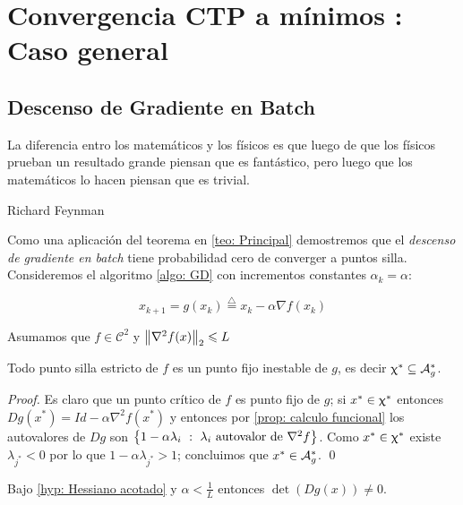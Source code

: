 \chapter{Convergencia CTP a m\'inimos : Caso general}\label{ch: aplicaciones}
\section{Descenso de Gradiente en Batch}

\epigraph{La diferencia entro los matem\'aticos y los f\'isicos es que luego de que los f\'isicos prueban un resultado grande piensan que es fant\'astico, pero luego que los matem\'aticos lo hacen piensan que es trivial.}{Richard Feynman}

Como una aplicaci\'on del teorema en \ref{teo: Principal} demostremos que el \textit{descenso de gradiente en batch} tiene probabilidad cero de converger a puntos silla. Consideremos el algoritmo \ref{algo: GD} con incrementos constantes $\alpha_k = \alpha$:

\begin{equation}
	\label{eq: GD}
	x_{k+1} = g(x_k) \stackrel{\triangle}{=} x_k - \alpha \nabla f(x_k)
\end{equation}

\begin{hyp}
	\label{hyp: Hessiano acotado}
	Asumamos que $f \in \mathcal{C}^2$ y $\left\lVert\nabla^2 f(x)\right\rVert_2 \leqslant L$
\end{hyp}

\begin{proposition}
	\label{prop: GD los puntos silla estrictos son fijos inestables}
	Todo punto silla estricto de $f$ es un punto fijo inestable de $g$, es decir $\upchi^* \subseteq \mathcal{A}_{g}^{*}$.
\end{proposition}

\begin{proof}
	Es claro que un punto cr\'itico de $f$ es punto fijo de $g$; si $x^* \in \upchi^*$ entonces $Dg(x^*) = Id - \alpha \nabla^2 f(x^*)$ y entonces por \ref{prop: calculo funcional} los autovalores de $Dg$ son $\left\lbrace1 - \alpha \lambda_i ~:~ \lambda_i \text{ autovalor de $\nabla^2 f$}\right\rbrace$. Como $x^* \in \upchi^*$ existe $\lambda_{j^*} < 0$ por lo que $1 - \alpha\lambda_{j^*} >1$; concluimos que $x^{*} \in \mathcal{A}_{g}^{*}$. \qed
	
\end{proof}

\begin{proposition}
	\label{prop: GD g es difeo local}
	Bajo \ref{hyp: Hessiano acotado} y $\alpha < \frac{1}{L}$ entonces $\det \left(Dg (x)\right) \neq 0$.
\end{proposition}


